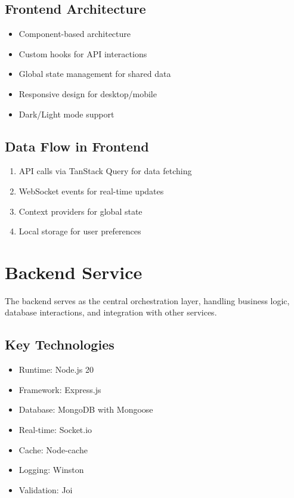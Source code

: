 \subsection{Frontend Architecture}

\begin{itemize}
    \item Component-based architecture
    \item Custom hooks for API interactions
    \item Global state management for shared data
    \item Responsive design for desktop/mobile
    \item Dark/Light mode support
\end{itemize}

\subsection{Data Flow in Frontend}

\begin{enumerate}
    \item API calls via TanStack Query for data fetching
    \item WebSocket events for real-time updates
    \item Context providers for global state
    \item Local storage for user preferences
\end{enumerate}

\section{Backend Service}

The backend serves as the central orchestration layer, handling business logic, database interactions, and integration with other services.

\subsection{Key Technologies}

\begin{itemize}
    \item Runtime: Node.js 20
    \item Framework: Express.js
    \item Database: MongoDB with Mongoose
    \item Real-time: Socket.io
    \item Cache: Node-cache
    \item Logging: Winston
    \item Validation: Joi
\end{itemize}

